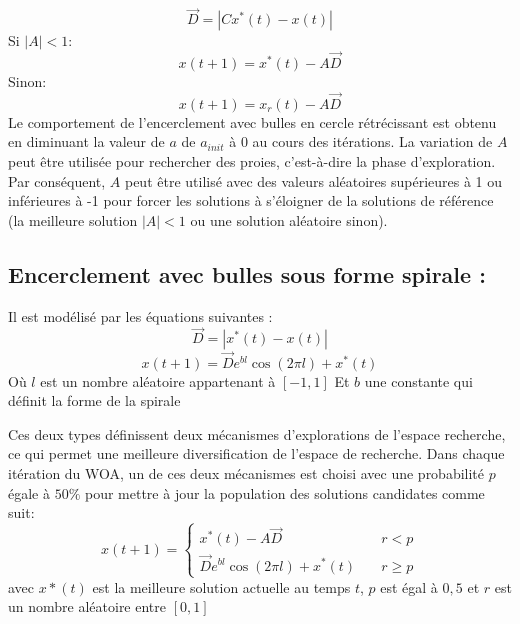 \documentclass[class=article, crop=false]{standalone}
\begin{document}
\begin{equation*}
    \vec{D} = |Cx^*(t) - x(t)|
\end{equation*}
Si \(|A| < 1\):
\begin{equation}
    x(t+1) = x^*(t) - A\vec{D}
\end{equation}
Sinon:
\begin{equation}
    x(t+1) = x_r(t) - A\vec{D}
\end{equation}
Le comportement de l’encerclement avec bulles en cercle rétrécissant est obtenu en diminuant la valeur de \(a\) de \(a_{init}\) à 0 au cours des itérations. La variation de \(A\) peut être utilisée pour rechercher des proies, c'est-à-dire la phase d'exploration. Par conséquent, \(A\) peut être utilisé avec des valeurs aléatoires supérieures à 1 ou inférieures à -1 pour forcer les solutions à s'éloigner de la solutions de référence (la meilleure solution \(|A| < 1\) ou une solution aléatoire sinon).
\subsection{Encerclement avec bulles sous forme spirale :}
Il est modélisé par les équations suivantes :
\begin{equation}
    \vec{D} = |x^*(t) - x(t)|
\end{equation}
\begin{equation}
    x(t+1) = \vec{D} e^{bl} \cos (2\pi l) + x^*(t)
\end{equation}
Où \(l\) est un nombre aléatoire appartenant à \([-1,1]\) Et \(b\) une constante qui définit la forme de la spirale 

Ces deux types définissent deux mécanismes d’explorations de l’espace recherche, ce qui permet une meilleure diversification de l’espace de recherche.
Dans chaque itération du WOA, un de ces deux mécanismes est choisi avec une probabilité \(p\) égale à \(50\%\) pour mettre à jour la population des solutions candidates comme suit:
\[ x(t+1) =
  \begin{cases}
    x^*(t) - A\vec{D}       & \quad r < p\\
    \vec{D} e^{bl} \cos (2\pi l) + x^*(t)  & \quad r \geq p
  \end{cases}
\]
avec \(x*(t)\) est la meilleure solution actuelle au temps \(t\), \(p\) est égal à \(0,5\) et \(r\) est un nombre aléatoire entre \([0, 1]\)
\end{document}
